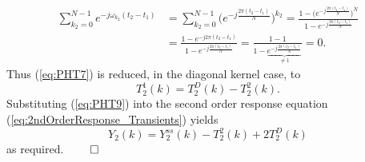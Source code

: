 \begin{subappendices}
\begin{equation*}
\begin{aligned}
\sum\limits_{k_{2}=0}^{N-1} e^{-j \omega_{k_{2}}(t_2 - t_1)} &= \sum\limits_{k_{2}=0}^{N-1} \bigg(e^{-j \frac{2 \pi (t_2 - t_1)}{N}} \bigg)^{k_{2}}  = \frac{1 - \bigg(e^{-j \frac{2 \pi (t_2 - t_1)}{N}} \bigg)^{N}}{1 - e^{-j \frac{2 \pi (t_2 - t_1)}{N}}} \\
&= \frac{1 - e^{-j 2 \pi (t_2 - t_1)}} {1 - e^{-j \frac{2 \pi (t_2 - t_1)}{N}}} = \frac{1 - 1}{1 - \underbrace{e^{-j \frac{2 \pi (t_2 - t_1)}{N}}}_{\neq 1}} = 0.
\end{aligned}
\end{equation*}
Thus (\ref{eq:PHT7}) is reduced, in the diagonal kernel case, to
\begin{equation}
T_2^1(k) = T_2^D(k) - T_2^2(k).
\label{eq:PHT9}
\end{equation}
Substituting (\ref{eq:PHT9}) into the second order response equation (\ref{eq:2ndOrderResponse_Transients}) yields
\begin{equation}
Y_2(k) = Y_2^{ss}(k) - T_2^2(k) + 2T_2^D(k)
\label{eq:PHT10}
\end{equation}
as required. \hfill $\qed$

\allowdisplaybreaks[0]

\end{subappendices}